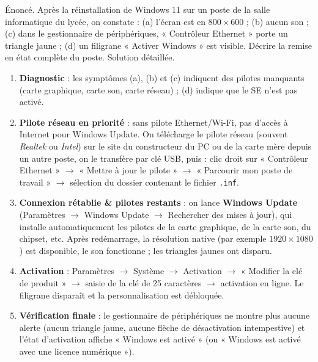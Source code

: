 \documentclass[11pt]{article}
\begin{document}
\begin{exoresolu}
Énoncé. Après la réinstallation de Windows 11 sur un poste de la salle informatique du lycée, on constate : (a) l'écran est en $800 \times 600$ ; (b) aucun son ; (c) dans le gestionnaire de périphériques, « Contrôleur Ethernet » porte un triangle jaune ; (d) un filigrane « Activer Windows » est visible. Décrire la remise en état complète du poste.
\tcblower
Solution détaillée.
\begin{enumerate}
  \item \textbf{Diagnostic} : les symptômes (a), (b) et (c) indiquent des pilotes manquants (carte graphique, carte son, carte réseau) ; (d) indique que le SE n'est pas activé.
  \item \textbf{Pilote réseau en priorité} : sans pilote Ethernet/Wi-Fi, pas d'accès à Internet pour Windows Update. On télécharge le pilote réseau (souvent \emph{Realtek} ou \emph{Intel}) sur le site du constructeur du PC ou de la carte mère depuis un autre poste, on le transfère par clé USB, puis : clic droit sur « Contrôleur Ethernet » $\rightarrow$ « Mettre à jour le pilote » $\rightarrow$ « Parcourir mon poste de travail » $\rightarrow$ sélection du dossier contenant le fichier \texttt{.inf}.
  \item \textbf{Connexion rétablie \& pilotes restants} : on lance \textbf{Windows Update} (Paramètres $\rightarrow$ Windows Update $\rightarrow$ Rechercher des mises à jour), qui installe automatiquement les pilotes de la carte graphique, de la carte son, du chipset, etc. Après redémarrage, la résolution native (par exemple $1920 \times 1080$) est disponible, le son fonctionne ; les triangles jaunes ont disparu.
  \item \textbf{Activation} : Paramètres $\rightarrow$ Système $\rightarrow$ Activation $\rightarrow$ « Modifier la clé de produit » $\rightarrow$ saisie de la clé de 25 caractères $\rightarrow$ activation en ligne. Le filigrane disparaît et la personnalisation est débloquée.
  \item \textbf{Vérification finale} : le gestionnaire de périphériques ne montre plus aucune alerte (aucun triangle jaune, aucune flèche de désactivation intempestive) et l'état d'activation affiche « Windows est activé » (ou « Windows est activé avec une licence numérique »).
\end{enumerate}
\end{exoresolu}
\end{document}
